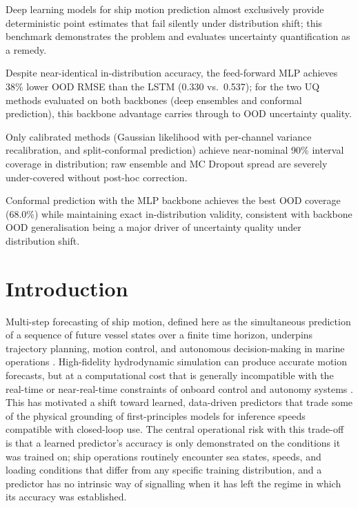 \documentclass[a4paper,fleqn]{cas-sc}
\begin{document}
\begin{highlights}
\item Deep learning models for ship motion prediction almost exclusively provide deterministic point estimates that fail silently under distribution shift; this benchmark demonstrates the problem and evaluates uncertainty quantification as a remedy.
\item Despite near-identical in-distribution accuracy, the feed-forward MLP achieves 38\% lower OOD RMSE than the LSTM (0.330 vs.\ 0.537); for the two UQ methods evaluated on both backbones (deep ensembles and conformal prediction), this backbone advantage carries through to OOD uncertainty quality.
\item Only calibrated methods (Gaussian likelihood with per-channel variance recalibration, and split-conformal prediction) achieve near-nominal 90\% interval coverage in distribution; raw ensemble and MC Dropout spread are severely under-covered without post-hoc correction.
\item Conformal prediction with the MLP backbone achieves the best OOD coverage (68.0\%) while maintaining exact in-distribution validity, consistent with backbone OOD generalisation being a major driver of uncertainty quality under distribution shift.
\end{highlights}
\maketitle
\section{Introduction}

Multi-step forecasting of ship motion, defined here as the simultaneous prediction of a sequence of future vessel states over a finite time horizon, underpins trajectory planning, motion control, and autonomous decision-making in marine operations \cite{fossen2011handbook}. High-fidelity hydrodynamic simulation can produce accurate motion forecasts, but at a computational cost that is generally incompatible with the real-time or near-real-time constraints of onboard control and autonomy systems \cite{thombre2022autonomous}. This has motivated a shift toward learned, data-driven predictors that trade some of the physical grounding of first-principles models for inference speeds compatible with closed-loop use. The central operational risk with this trade-off is that a learned predictor's accuracy is only demonstrated on the conditions it was trained on; ship operations routinely encounter sea states, speeds, and loading conditions that differ from any specific training distribution, and a predictor has no intrinsic way of signalling when it has left the regime in which its accuracy was established.
\end{document}
